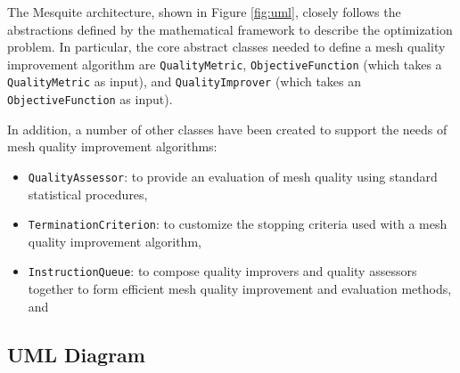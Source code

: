 \documentclass[letter]{report}
\begin{document}
The Mesquite architecture, shown in Figure \ref{fig:uml}, closely
follows the abstractions defined by the mathematical framework 
to describe the optimization problem.
In particular, the core abstract classes needed to
define a mesh quality improvement algorithm are {\tt QualityMetric},
{\tt ObjectiveFunction} (which takes a {\tt QualityMetric} as
input), and {\tt QualityImprover} (which takes an {\tt ObjectiveFunction}
as input).

In addition, a number of other classes have been created to support
the needs of mesh quality improvement algorithms:
\begin{itemize}
\item {\tt QualityAssessor}: to provide an evaluation of mesh
quality using standard statistical procedures,
\item {\tt TerminationCriterion}: to customize the stopping criteria
used with a mesh quality improvement algorithm,
\item {\tt InstructionQueue}: to compose quality improvers and
quality assessors together to form efficient mesh quality improvement
and evaluation methods, and
\end{itemize}

\subsection{UML Diagram}
\end{document}
